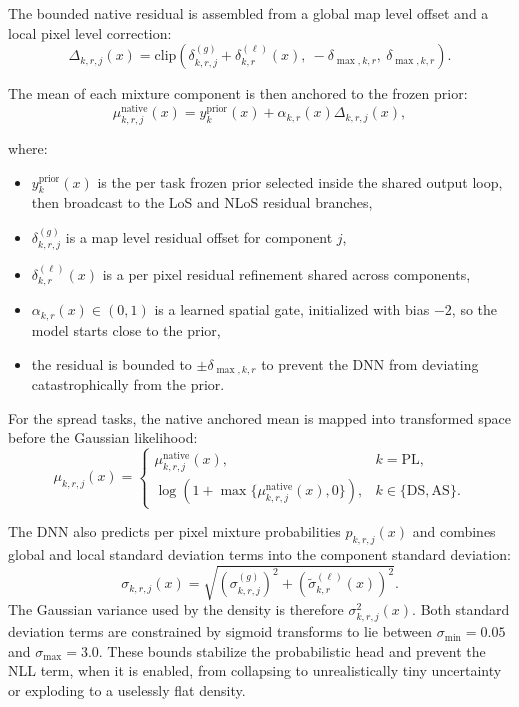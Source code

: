 The bounded native residual is assembled from a global map level offset and a
local pixel level correction:
\begin{equation}
\Delta_{k,r,j}(x)
=
\mathrm{clip}\!\left(
\delta^{(g)}_{k,r,j}
+
\delta^{(\ell)}_{k,r}(x),
\ -\delta_{\max,k,r},\
\delta_{\max,k,r}
\right).
\label{eq:try80_delta_assembly}
\end{equation}

The mean of each mixture component is then anchored to the frozen prior:
\begin{equation}
\mu^{\mathrm{native}}_{k,r,j}(x)
=
y^{\mathrm{prior}}_{k}(x)
+
\alpha_{k,r}(x)\Delta_{k,r,j}(x),
\label{eq:try80_mu}
\end{equation}

where:
\begin{itemize}
\item \(y^{\mathrm{prior}}_{k}(x)\) is the per task frozen prior selected inside
      the shared output loop, then broadcast to the LoS and NLoS residual
      branches,
\item \(\delta^{(g)}_{k,r,j}\) is a map level residual offset for component
      \(j\),
\item \(\delta^{(\ell)}_{k,r}(x)\) is a per pixel residual refinement shared
      across components,
\item \(\alpha_{k,r}(x) \in (0,1)\) is a learned spatial gate, initialized
      with bias \(-2\), so the model starts close to the prior,
\item the residual is bounded to \(\pm\delta_{\max,k,r}\) to prevent the DNN from
      deviating catastrophically from the prior.
\end{itemize}

For the spread tasks, the native anchored mean is mapped into transformed
space before the Gaussian likelihood:
\begin{equation}
\mu_{k,r,j}(x)
=
\begin{cases}
\mu^{\mathrm{native}}_{k,r,j}(x), & k=\mathrm{PL},\\
\log\!\left(1+\max\{\mu^{\mathrm{native}}_{k,r,j}(x),0\}\right),
& k\in\{\mathrm{DS},\mathrm{AS}\}.
\end{cases}
\label{eq:try80_mu_transform}
\end{equation}

The DNN also predicts per pixel mixture probabilities \(p_{k,r,j}(x)\) and
combines global and local standard deviation terms into the component standard
deviation:
\begin{equation}
\sigma_{k,r,j}(x)
=
\sqrt{
\left(\sigma^{(g)}_{k,r,j}\right)^2
+
\left(\tilde\sigma^{(\ell)}_{k,r}(x)\right)^2
}.
\label{eq:try80_sigma}
\end{equation}
The Gaussian variance used by the density is therefore
\(\sigma^2_{k,r,j}(x)\). Both standard deviation terms are constrained by
sigmoid transforms to lie between \(\sigma_{\min}=0.05\) and
\(\sigma_{\max}=3.0\). These bounds stabilize the probabilistic head and
prevent the NLL term, when it is enabled, from collapsing to unrealistically
tiny uncertainty or exploding to a uselessly flat density.

